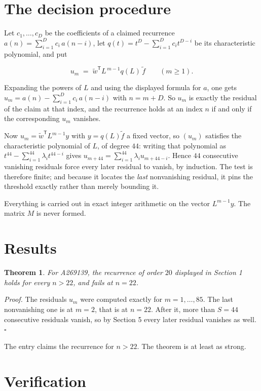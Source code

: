 \documentclass[11pt]{article}
\newtheorem{theorem}{Theorem}
\theoremstyle{definition}
\begin{document}
\section{The decision procedure}

Let $c_1,\dots,c_D$ be the coefficients of a claimed recurrence $a(n) = \sum_{i=1}^{D} c_i\,a(n-i)$, let $q(t) = t^{D} - \sum_{i=1}^{D} c_i t^{D-i}$ be its characteristic polynomial, and put

\[u_m \;=\; \tilde w^{\mathsf T} L^{\,m-1} q(L)\,\tilde f \qquad (m \ge 1).\]

Expanding the powers of $L$ and using the displayed formula for $a$, one gets $u_m = a(n) - \sum_{i=1}^{D} c_i\,a(n-i)$ with $n = m + D$. So $u_m$ is exactly the residual of the claim at that index, and the recurrence holds at an index $n$ if and only if the corresponding $u_m$ vanishes.

Now $u_m = \tilde w^{\mathsf T} L^{m-1} y$ with $y = q(L)\tilde f$ a fixed vector, so $(u_m)$ satisfies the characteristic polynomial of $L$, of degree $44$: writing that polynomial as $t^{44} - \sum_{i=1}^{44} \lambda_i t^{44-i}$ gives $u_{m+44} = \sum_{i=1}^{44} \lambda_i u_{m+44-i}$. Hence $44$ consecutive vanishing residuals force every later residual to vanish, by induction. The test is therefore finite; and because it locates the {\itshape last} nonvanishing residual, it pins the threshold exactly rather than merely bounding it.

Everything is carried out in exact integer arithmetic on the vector $L^{m-1}y$. The matrix $M$ is never formed.

\section{Results}

\begin{theorem} For A269139, the recurrence of order $20$ displayed in Section 1 holds for every $n > 22$, and fails at $n = 22$.\end{theorem}

{\itshape Proof.} The residuals $u_m$ were computed exactly for $m = 1,\dots,85$. The last nonvanishing one is at $m = 2$, that is at $n = 22$. After it, more than $S = 44$ consecutive residuals vanish, so by Section 5 every later residual vanishes as well. $\square$

The entry claims the recurrence for $n > 22$. The theorem is at least as strong.

\section{Verification}
\end{document}
